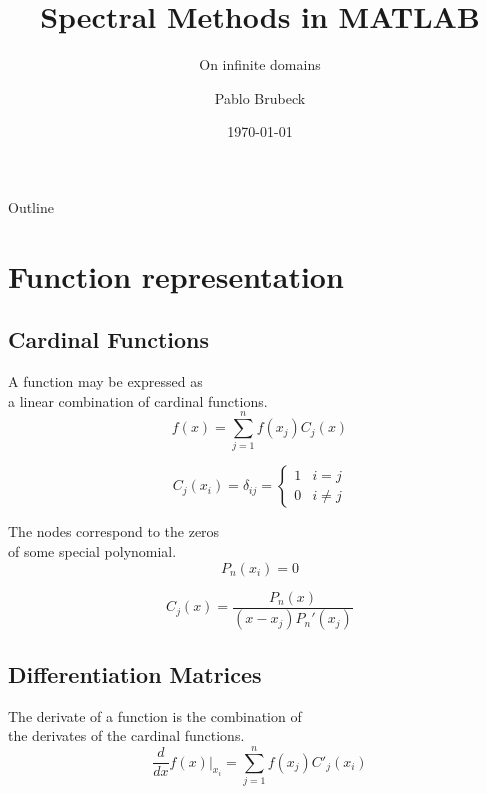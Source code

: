 \documentclass{beamer}
\title{Spectral Methods in MATLAB}
\subtitle{On infinite domains}
\author{Pablo Brubeck\inst{1}}
\institute[ITESM]
{
  \inst{1}%
  Department of Physics\\
  Tecnologico de Monterrey
}
\date{\today}
\begin{document}
\begin{frame}
  \titlepage
\end{frame}

\begin{frame}{Outline}
  \tableofcontents
\end{frame}

\section{Function representation}

\subsection{Cardinal Functions}

\begin{frame}{A function may be expressed as\\ a linear combination of cardinal functions.}{}
\begin{equation*}
f(x) = \sum_{j=1}^n f(x_j) C_j(x)
\end{equation*}

\begin{equation*}
C_j(x_i) = \delta_{ij}=\begin{cases}1&i=j\\0&i\neq j\end{cases}
\end{equation*}
\end{frame}

\begin{frame}{The nodes correspond to the zeros\\ of some special polynomial.}{}
\begin{equation*}
P_n(x_i) = 0
\end{equation*}

\begin{equation*}
C_j(x) = \frac{P_n(x)}{(x-x_j)P_n'(x_j)}
\end{equation*}
\end{frame}


\subsection{Differentiation Matrices}

\begin{frame}{The derivate of a function is the combination of\\ the derivates of the cardinal functions.}
\begin{equation*}
\frac{d}{dx}f(x)|_{x_i} = \sum_{j=1}^n f(x_j) C'_j(x_i)
\end{equation*}
\end{frame}
\end{document}
